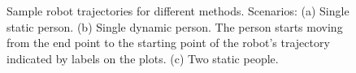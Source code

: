 \begin{figure}[t!]
\centering
{}%
%
%

\caption{Sample robot trajectories for different methods. Scenarios: (a) Single static person. (b) Single dynamic person. The person starts moving from the end point to the starting point of the robot's trajectory indicated by labels on the plots. (c) Two static people.}
\label{fig:trajs}
\end{figure}


